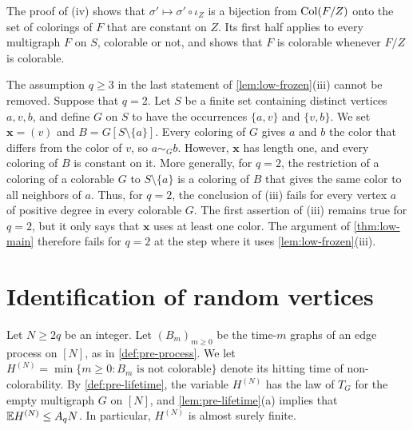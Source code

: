 The proof of (iv) shows that $\sigma' \mapsto \sigma' \circ \iota_Z$ is a bijection from $\operatorname{Col}(F/Z)$ onto the set of colorings of $F$ that are constant on $Z$. Its first half applies to every multigraph $F$ on $S$, colorable or not, and shows that $F$ is colorable whenever $F/Z$ is colorable.

\begin{remark}\label{rem:low-q2}
The assumption $q \ge 3$ in the last statement of \cref{lem:low-frozen}(iii) cannot be removed. Suppose that $q = 2$. Let $S$ be a finite set containing distinct vertices $a, v, b$, and define $G$ on $S$ to have the occurrences $\{a, v\}$ and $\{v, b\}$. We set $\mathbf x = (v)$ and $B = G[S \setminus \{a\}]$. Every coloring of $G$ gives $a$ and $b$ the color that differs from the color of $v$, so $a \sim_G b$. However, $\mathbf x$ has length one, and every coloring of $B$ is constant on it. More generally, for $q = 2$, the restriction of a coloring of a colorable $G$ to $S \setminus \{a\}$ is a coloring of $B$ that gives the same color to all neighbors of $a$. Thus, for $q = 2$, the conclusion of (iii) fails for every vertex $a$ of positive degree in every colorable $G$. The first assertion of (iii) remains true for $q = 2$, but it only says that $\mathbf x$ uses at least one color. The argument of \cref{thm:low-main} therefore fails for $q = 2$ at the step where it uses \cref{lem:low-frozen}(iii).
\end{remark}

\section{Identification of random vertices}\label{sec:low-identify}

Let $N \ge 2q$ be an integer. Let $(B_m)_{m \ge 0}$ be the time-$m$ graphs of an edge process on $[N]$, as in \cref{def:pre-process}. We let $H^{(N)} = \min\{m \ge 0 : B_m \text{ is not colorable}\}$ denote its hitting time of non-colorability. By \cref{def:pre-lifetime}, the variable $H^{(N)}$ has the law of $T_G$ for the empty multigraph $G$ on $[N]$, and \cref{lem:pre-lifetime}(a) implies that $\mathbb E H^{(N)} \le A_q N$. In particular, $H^{(N)}$ is almost surely finite.

